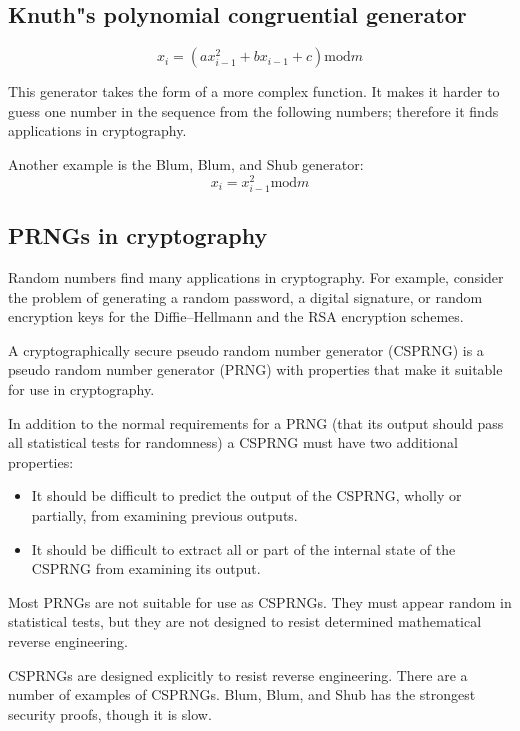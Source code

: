 \documentclass[justified, sixbynine]{tufte-book}
\theoremstyle{plain}%
\newtheorem * {corollary}{Corollary}
\theoremstyle{definition}
\theoremstyle{remark}
\newtheorem * {remark}{Remark}
\newtheorem * {note}{Note}
\begin{document}
\begin{fullwidth}
\goodbreak\subsection{Knuth"s polynomial congruential generator}

\begin{equation}
x_i=(ax_{i-1}^2+bx_{i-1}+c)\textrm{mod}m
\end{equation}

This generator takes the form of a more complex function. It makes it harder to guess one number in the sequence from the following numbers; therefore
it finds applications in cryptography.

Another example is the Blum, Blum, and Shub generator:
\begin{equation}
x_i=x_{i-1}^2\textrm{mod}m
\end{equation}

\goodbreak\subsection{PRNGs in cryptography}

Random numbers find many applications in cryptography. For example, consider
the problem of generating a random password, a digital signature, or random
encryption keys for the Diffie--Hellmann and the RSA encryption schemes.

A cryptographically secure pseudo random number generator (CSPRNG) is a
pseudo random number generator (PRNG) with properties that make it suitable
for use in cryptography.

In addition to the normal requirements for a PRNG (that its output
should pass all statistical tests for randomness) a CSPRNG must have two
additional properties:

\begin{itemize}
\item  It should be difficult to predict the output of the CSPRNG, wholly or
partially, from examining previous outputs.

\item  It should be difficult to extract all or part of the internal state
of the CSPRNG from examining its output.
\end{itemize}

Most PRNGs are not suitable for use as CSPRNGs. They must appear random
in statistical tests, but they are not designed to resist determined
mathematical reverse engineering.

CSPRNGs are designed explicitly to resist reverse engineering. There are a
number of examples of CSPRNGs. Blum, Blum, and Shub has the strongest security
proofs, though it is slow.


\end{fullwidth}
\end{document}
